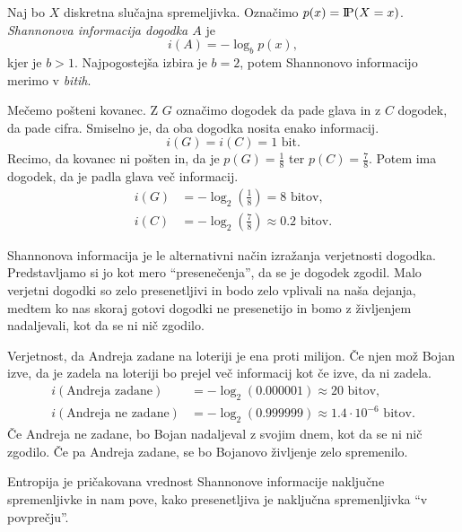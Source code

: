 \documentclass[fin1, tisk]{fmfdelo}
\newcommand{\probP}{\text{I\kern-0.15em P}}
\theoremstyle{definition}
\begin{document}
\begin{definicija}
    Naj bo $X$ diskretna slučajna spremeljivka. Označimo $p(x) = \probP(X = x)$. 
    \emph{Shannonova informacija dogodka $A$} je
    \[
        i(A) = - \log_b p(x),
    \]
    kjer je $b > 1$. Najpogostejša izbira je $b=2$, potem Shannonovo informacijo merimo v 
    \emph{bitih}. 
\end{definicija}

\begin{primer}
    Mečemo pošteni kovanec. Z $G$ označimo dogodek da pade glava in z $C$ dogodek, da pade cifra.
    Smiselno je, da oba dogodka nosita enako informacij.
    \[
        i(G) = i(C) = 1 \text{ bit}.
    \]
    Recimo, da kovanec ni pošten in, da je $p(G) = \frac{1}{8}$ ter $p(C) = \frac{7}{8}$.
    Potem ima dogodek, da je padla glava več informacij.
    \begin{align*}
        i(G) &= - \log_2 \left( \frac{1}{8} \right) = 8 \text{ bitov}, \\
        i(C) &= - \log_2 \left( \frac{7}{8} \right) \approx 0.2 \text{ bitov}.
    \end{align*}
\end{primer} 

Shannonova informacija je le alternativni način izražanja verjetnosti dogodka. Predstavljamo si 
jo kot mero ``presenečenja'', da se je dogodek zgodil. Malo verjetni dogodki so zelo presenetljivi
in bodo zelo vplivali na naša dejanja, medtem ko nas skoraj gotovi dogodki ne presenetijo in bomo
z življenjem nadaljevali, kot da se ni nič zgodilo.

\begin{primer}
    Verjetnost, da Andreja zadane na loteriji je ena proti milijon. Če njen mož Bojan izve, da je
    zadela na loteriji bo prejel več informacij kot če izve, da ni zadela.
    \begin{align*}
        i(\text{Andreja zadane}) &= - \log_2 (0.000001) \approx 20 \text{ bitov}, \\
        i(\text{Andreja ne zadane}) &= - \log_2 (0.999999) \approx 1.4 \cdot 10^{-6} \text{ bitov}.
    \end{align*}
    Če Andreja ne zadane, bo Bojan nadaljeval z svojim dnem, kot da se ni nič zgodilo. Če pa 
    Andreja zadane, se bo Bojanovo življenje zelo spremenilo.
\end{primer}

Entropija je pričakovana vrednost Shannonove informacije naključne spremenljivke in nam pove,
kako presenetljiva je naključna spremenljivka ``v povprečju''.
\end{document}
